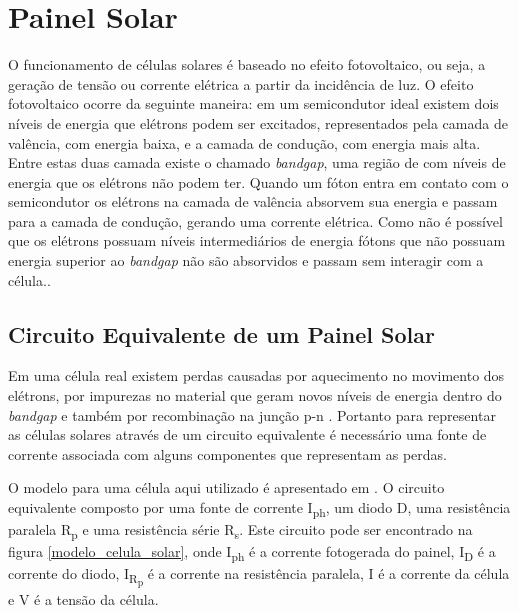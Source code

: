 \chapter{Painel Solar}

O funcionamento de células solares é baseado no efeito fotovoltaico, ou seja, a geração de tensão ou corrente elétrica a partir da incidência de luz. O efeito fotovoltaico ocorre da seguinte maneira: em um semicondutor ideal existem dois níveis de energia que elétrons podem ser excitados, representados pela camada de valência, com energia baixa, e a camada de condução, com energia mais alta. Entre estas duas camada existe o chamado \textit{bandgap}, uma região de com níveis de energia que os elétrons não podem ter. Quando um fóton entra em contato com o semicondutor os elétrons na camada de valência absorvem sua energia e passam para a camada de condução, gerando uma corrente elétrica. Como não é possível que os elétrons possuam níveis intermediários de energia fótons que não possuam energia superior ao \textit{bandgap} não são absorvidos e passam sem interagir com a célula.\cite{jager2014}.

\section{Circuito Equivalente de um Painel Solar}

Em uma célula real existem perdas causadas por aquecimento no movimento dos elétrons, por impurezas no material que geram novos níveis de energia dentro do \textit{bandgap} e também por recombinação na junção p-n \cite{blakers2013}. Portanto para representar as células solares através de um circuito equivalente é necessário uma fonte de corrente associada com alguns componentes que representam as perdas.

O modelo para uma célula aqui utilizado é apresentado em \cite{erdem2013}. O circuito equivalente composto por uma fonte de corrente I\textsubscript{ph}, um diodo D, uma resistência paralela R\textsubscript{p} e uma resistência série R\textsubscript{s}. Este circuito pode ser encontrado na figura \ref{modelo_celula_solar}, onde I\textsubscript{ph} é a corrente fotogerada do painel, I\textsubscript{D} é a corrente do diodo, I\textsubscript{R\textsubscript{p}} é a corrente na resistência paralela, I é a corrente da célula e V é a tensão da célula.

